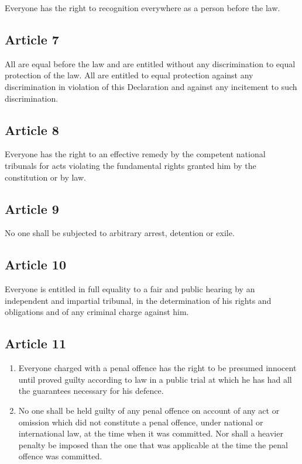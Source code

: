 \documentclass[
  titlepage,
  openright,
  DIV=calc,
  toc=listof,
  listof=nochaptergap]{scrbook}
\begin{document}
Everyone has the right to recognition everywhere as a person before the
law.

\subsection{Article 7}\label{article-7-2}

All are equal before the law and are entitled without any discrimination
to equal protection of the law. All are entitled to equal protection
against any discrimination in violation of this Declaration and against
any incitement to such discrimination.

\subsection{Article 8}\label{article-8-2}

Everyone has the right to an effective remedy by the competent national
tribunals for acts violating the fundamental rights granted him by the
constitution or by law.

\subsection{Article 9}\label{article-9-2}

No one shall be subjected to arbitrary arrest, detention or exile.

\subsection{Article 10}\label{article-10-2}

Everyone is entitled in full equality to a fair and public hearing by an
independent and impartial tribunal, in the determination of his rights
and obligations and of any criminal charge against him.

\subsection{Article 11}\label{article-11-2}

\begin{enumerate}
\def\labelenumi{\arabic{enumi}.}
\item
  Everyone charged with a penal offence has the right to be presumed
  innocent until proved guilty according to law in a public trial at
  which he has had all the guarantees necessary for his defence.
\item
  No one shall be held guilty of any penal offence on account of any act
  or omission which did not constitute a penal offence, under national
  or international law, at the time when it was committed. Nor shall a
  heavier penalty be imposed than the one that was applicable at the
  time the penal offence was committed.
\end{enumerate}
\end{document}

